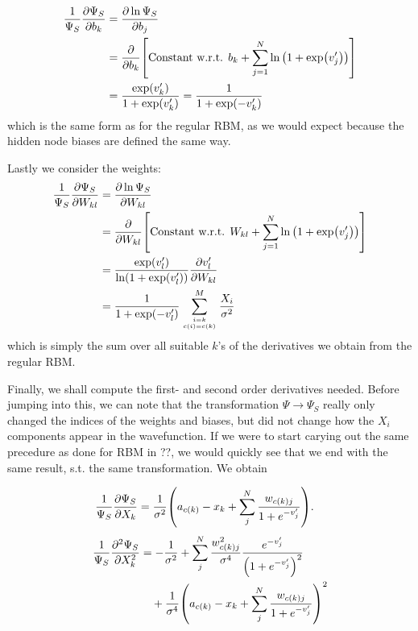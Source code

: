 \documentclass[Thesis.tex]{subfiles}
\begin{document}
\begin{align}
    \frac{1}{\Psi_S} \pdv{\Psi_S}{b_k} &= \pdv{\ln\Psi_S}{b_j}\\
    &= \pdv{}{b_k}\qty[\text{Constant w.r.t. }b_k +
    \sum_{j=1}^N\ln\qty(1+\exp(v_j'))]\\
    &= \frac{\exp(v_k')}{1 + \exp(v_k')} = \frac{1}{1 + \exp(-v_k')}\label{eq:rbm-sym-deriv-b}
\end{align}
which is the same form as for the regular RBM, as we would expect because the
hidden node biases are defined the same way.

Lastly we consider the weights:
\begin{align}
    \frac{1}{\Psi_S} \pdv{\Psi_S}{W_{kl}} &= \pdv{\ln\Psi_S}{W_{kl}}\\
    &= \pdv{}{W_{kl}}\qty[\text{Constant w.r.t. }W_{kl} +
    \sum_{j=1}^N\ln\qty(1+\exp(v_j'))]\\
    &= \frac{\exp(v_l')}{\ln(1 + \exp(v_l'))} \pdv{v_l'}{W_{kl}}\\
    &= \frac{1}{1 + \exp(-v_l')}\sum_{i=k\atop{c(i)=c(k)}}^M
    \frac{X_i}{\sigma^2} \label{eq:rbm-sym-deriv-W}
\end{align}
which is simply the sum over all suitable $k$'s of the derivatives we obtain
from the regular RBM.

Finally, we shall compute the first- and second order derivatives needed. Before
jumping into this, we can note that the transformation $\Psi\rightarrow\Psi_S$ really
only changed the indices of the weights and biases, but did not change how the
$X_i$ components appear in the wavefunction. If we were to start carying out the
same precedure as done for RBM in ??, we would quickly see that we end with the
same result, s.t. the same transformation. We obtain

\begin{align}
    \frac{1}{\Psi_S} \pdv{\Psi_S}{X_k} &= \frac{1}{\sigma^2}\qty(a_{c(k)}-x_k +
    \sum_j^N \frac{w_{c(k)j}}{1+e^{-v_j'}}).\label{eq:rbm-sym-first-order-deriv}
\end{align}
\begin{align}
    \begin{split}
    \frac{1}{\Psi_S}\pdv[2]{\Psi_S}{X_k}
        &= -\frac{1}{\sigma^2} + \sum_j^N
        \frac{w_{c(k)j}^2}{\sigma^4}
        \frac{e^{-v_j'}}{\qty(1+e^{-v_j'})^2} \\
        &\quad{   } +
        \frac{1}{\sigma^4}\qty(a_{c(k)}-x_k+\sum_j^N
        \frac{w_{{c(k)}j}}{1+e^{-v_j'}})^2
    \end{split}\label{eq:rbm-sym-second-deriv}
\end{align}
\end{document}

